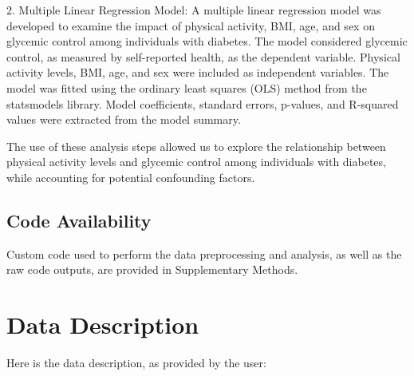 \documentclass[11pt]{article}
\begin{document}
2. Multiple Linear Regression Model: A multiple linear regression model was developed to examine the impact of physical activity, BMI, age, and sex on glycemic control among individuals with diabetes. The model considered glycemic control, as measured by self-reported health, as the dependent variable. Physical activity levels, BMI, age, and sex were included as independent variables. The model was fitted using the ordinary least squares (OLS) method from the statsmodels library. Model coefficients, standard errors, p-values, and R-squared values were extracted from the model summary.

The use of these analysis steps allowed us to explore the relationship between physical activity levels and glycemic control among individuals with diabetes, while accounting for potential confounding factors.\subsection*{Code Availability}

Custom code used to perform the data preprocessing and analysis, as well as the raw code outputs, are provided in Supplementary Methods.


\clearpage
\appendix

\section{Data Description} \label{sec:data_description} Here is the data description, as provided by the user:
\end{document}

